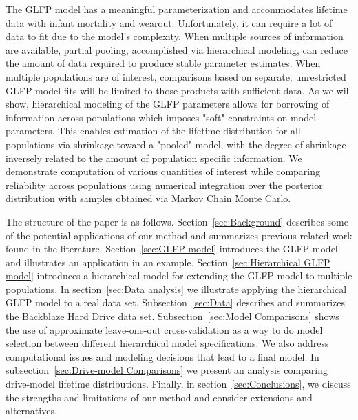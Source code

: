 \documentclass[12pt]{article}
\begin{document}
The GLFP model has a meaningful parameterization and accommodates lifetime data with infant mortality and wearout.  Unfortunately, it can require a lot of data to fit due to the model's complexity. When multiple sources of information are available, partial pooling, accomplished via hierarchical modeling, can reduce the amount of data required to produce stable parameter estimates. When multiple populations are of interest, comparisons based on separate, unrestricted GLFP model fits will be limited to those products with sufficient data. As we will show, hierarchical modeling of the GLFP parameters allows for borrowing of information across populations which imposes "soft" constraints on model parameters. This enables estimation of the lifetime distribution for all populations via shrinkage toward a "pooled" model, with the degree of shrinkage inversely related to the amount of population specific information. We demonstrate computation of various quantities of interest while comparing reliability across populations using numerical integration over the posterior distribution with samples obtained via  Markov Chain Monte Carlo. 

The structure of the paper is as follows.  Section~\ref{sec:Background} describes some of the potential applications of our method and summarizes previous related work found in the literature. Section~\ref{sec:GLFP model} introduces the GLFP model and illustrates an application in an example. Section~\ref{sec:Hierarchical GLFP model} introduces a hierarchical model for extending the GLFP model to multiple populations. In section~\ref{sec:Data analysis} we illustrate applying the hierarchical GLFP model to a real data set. Subsection~\ref{sec:Data} describes and summarizes the Backblaze Hard Drive data set.  Subsection~\ref{sec:Model Comparisons} shows the use of approximate leave-one-out cross-validation as a way to do model selection between different hierarchical model specifications. We also address computational issues and modeling decisions that lead to a final model.  In subsection~\ref{sec:Drive-model Comparisons} we present an analysis comparing drive-model lifetime distributions.  Finally, in section~\ref{sec:Conclusions}, we discuss the strengths and limitations of our method and consider extensions and alternatives.
\end{document}
